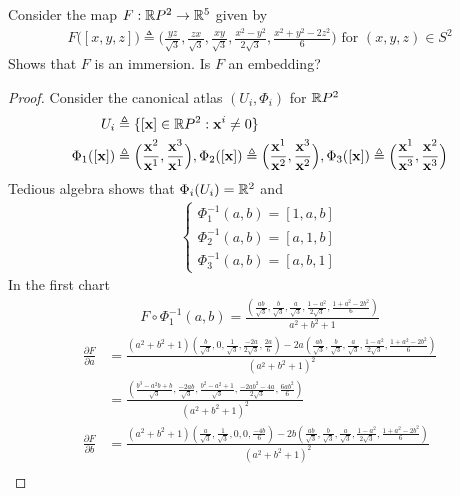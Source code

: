 \documentclass{report}
\begin{document}
\begin{question}{}{}
Consider the map $F:\mathbb{R} P^2\rightarrow \mathbb{R}^5$ given by 
\begin{align*}
F\Big([x,y,z] \Big)\triangleq \Big( \frac{yz}{\sqrt{3} }, \frac{zx}{\sqrt{3} },\frac{xy}{\sqrt{3} },\frac{x^2-y^2}{2 \sqrt{3} }, \frac{x^2+y^2-2z^2}{6} \Big)\text{ for }(x,y,z)\in S^2
\end{align*}
Shows that $F$ is an immersion. Is  $F$ an embedding? 
\end{question}
\begin{proof}
Consider the canonical atlas $(U_i,\Phi_i)$ for $\mathbb{R} P^2$ 
\begin{align*}
  U_i&\triangleq \{ [\textbf{x}]\in\mathbb{R} P^2: \textbf{x}^i\neq 0  \}\\
  \Phi_1([\textbf{x}])&\triangleq \Big(\frac{\textbf{x}^2}{\textbf{x}^1}, \frac{\textbf{x}^3}{\textbf{x}^1}\Big),\Phi_2 ([\textbf{x}])\triangleq  \Big( \frac{\textbf{x}^1}{\textbf{x}^2}, \frac{\textbf{x}^3}{\textbf{x}^2} \Big), \Phi_3([\textbf{x}])\triangleq  \Big( \frac{\textbf{x}^1}{\textbf{x}^3}, \frac{\textbf{x}^2}{\textbf{x}^3} \Big)
\end{align*}
Tedious algebra shows that $\Phi_i(U_i)=\mathbb{R}^2$ and  
\begin{align*}
\begin{cases}
 \Phi_1^{-1} (a,b)= [1,a,b]\\
 \Phi_2^{-1}(a,b)=[a,1,b]\\
 \Phi_3^{-1} (a,b)= [a,b,1] 
\end{cases}
\end{align*}
In the first chart  
\begin{align*}
F\circ \Phi_1^{-1}(a,b)= \frac{(\frac{ab}{\sqrt{3} }, \frac{b}{\sqrt{3} }, \frac{a}{\sqrt{3} }, \frac{1-a^2}{2 \sqrt{3} }, \frac{1+a^2-2b^2}{6})}{a^2+b^2+1}
\end{align*}
\begin{align*}
  \frac{\partial F}{\partial a}&= \frac{(a^2+b^2+1)( \frac{b}{\sqrt{3}} , 0 , \frac{1}{\sqrt{3}}, \frac{-2a}{2\sqrt{3}} , \frac{2a}{6} )-2a(\frac{ab}{\sqrt{3} }, \frac{b}{\sqrt{3} }, \frac{a}{\sqrt{3} }, \frac{1-a^2}{2 \sqrt{3} }, \frac{1+a^2-2b^2}{6}) }{(a^2+b^2+1)^2} \\
  &= \frac{(\frac{b^3-a^2b+b}{\sqrt{3} }, \frac{-2ab}{\sqrt{3} }, \frac{b^2-a^2+1}{\sqrt{3} }, \frac{-2ab^2-4a}{2\sqrt{3} }, \frac{6ab^2}{6} )}{(a^2+b^2+1)^2} \\
  \frac{\partial F}{\partial b}&=  \frac{(a^2+b^2+1)(\frac{a}{\sqrt{3} }, \frac{1}{\sqrt{3} },0,0, \frac{-4b}{6})- 2b(\frac{ab}{\sqrt{3} }, \frac{b}{\sqrt{3} }, \frac{a}{\sqrt{3} }, \frac{1-a^2}{2 \sqrt{3} }, \frac{1+a^2-2b^2}{6})}{(a^2+b^2+1)^2} \\

\end{align*}
\end{proof}
\end{document}
